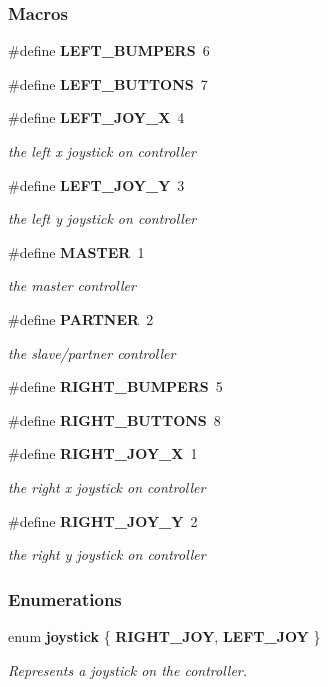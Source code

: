 \subsubsection*{Macros}
\begin{DoxyCompactItemize}
\item 
\#define \textbf{ L\+E\+F\+T\+\_\+\+B\+U\+M\+P\+E\+RS}~6
\item 
\#define \textbf{ L\+E\+F\+T\+\_\+\+B\+U\+T\+T\+O\+NS}~7
\item 
\#define \textbf{ L\+E\+F\+T\+\_\+\+J\+O\+Y\+\_\+X}~4
\begin{DoxyCompactList}\small\item\em the left x joystick on controller \end{DoxyCompactList}\item 
\#define \textbf{ L\+E\+F\+T\+\_\+\+J\+O\+Y\+\_\+Y}~3
\begin{DoxyCompactList}\small\item\em the left y joystick on controller \end{DoxyCompactList}\item 
\#define \textbf{ M\+A\+S\+T\+ER}~1
\begin{DoxyCompactList}\small\item\em the master controller \end{DoxyCompactList}\item 
\#define \textbf{ P\+A\+R\+T\+N\+ER}~2
\begin{DoxyCompactList}\small\item\em the slave/partner controller \end{DoxyCompactList}\item 
\#define \textbf{ R\+I\+G\+H\+T\+\_\+\+B\+U\+M\+P\+E\+RS}~5
\item 
\#define \textbf{ R\+I\+G\+H\+T\+\_\+\+B\+U\+T\+T\+O\+NS}~8
\item 
\#define \textbf{ R\+I\+G\+H\+T\+\_\+\+J\+O\+Y\+\_\+X}~1
\begin{DoxyCompactList}\small\item\em the right x joystick on controller \end{DoxyCompactList}\item 
\#define \textbf{ R\+I\+G\+H\+T\+\_\+\+J\+O\+Y\+\_\+Y}~2
\begin{DoxyCompactList}\small\item\em the right y joystick on controller \end{DoxyCompactList}\end{DoxyCompactItemize}
\subsubsection*{Enumerations}
\begin{DoxyCompactItemize}
\item 
enum \textbf{ joystick} \{ \textbf{ R\+I\+G\+H\+T\+\_\+\+J\+OY}, 
\textbf{ L\+E\+F\+T\+\_\+\+J\+OY}
 \}\begin{DoxyCompactList}\small\item\em Represents a joystick on the controller. \end{DoxyCompactList}
\end{DoxyCompactItemize}
